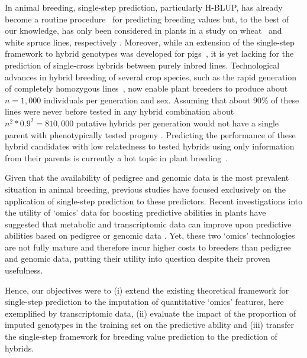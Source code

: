 \documentclass[12pt,titlepage]{article}
\begin{document}
In animal breeding, single-step prediction, particularly H-BLUP, has already 
become a routine procedure~\cite{Legarra2014} for predicting breeding values
but, to the best of our knowledge, has only been considered in plants in a study
on wheat~\cite{Ashraf2016} and white spruce lines, respectively
\cite{Ratcliffe2017}.
Moreover, while an extension of the single-step framework to hybrid genotypes
was developed for pigs~\cite{Xiang2016}, it is yet lacking for the prediction
of single-cross hybrids between purely inbred lines.
Technological advances in hybrid breeding of several crop species, such as the
rapid generation of completely homozygous lines~\cite{Wedzony2009}, now enable
plant breeders to produce about $n = 1,000$ individuals per generation and sex.
Assuming that about 90\% of these lines were never before tested in any hybrid
combination about $n^{2} * 0.9^{2} = 810,000$ putative hybrids per generation
would not have a single parent with phenotypically tested progeny
\cite{Westhues2017}.
Predicting the performance of these hybrid candidates with low relatedness to 
tested hybrids using only information from their parents is currently a hot topic
in plant breeding~\cite{Technow2014,Kadam2016,Westhues2017}.

Given that the availability of pedigree and genomic data is the most prevalent
situation in animal breeding, previous studies have focused exclusively on the
application of single-step prediction to these predictors.
Recent investigations into the utility of `omics' data for boosting predictive
abilities in plants have suggested that metabolic and transcriptomic data can
improve upon predictive abilities based on pedigree or genomic data
\cite{Guo2016,Xu2016,Dan2016,Zenke-Philippi2017,Westhues2017}.
Yet, these two `omics' technologies are not fully mature and therefore incur
higher costs to breeders than pedigree and genomic data, putting their utility
into question despite their proven usefulness.

Hence, our objectives were to (i) extend the existing theoretical framework for
single-step prediction to the imputation of quantitative `omics' features, here
exemplified by transcriptomic data, (ii) evaluate the impact of the proportion of
imputed genotypes in the training set on the predictive ability and (iii) transfer
the single-step framework for breeding value prediction to the prediction of
hybrids.
\end{document}
